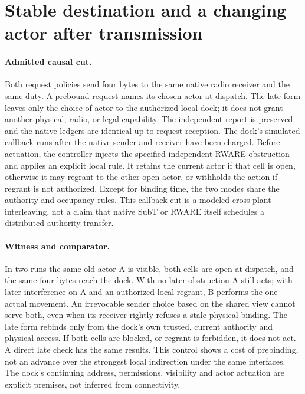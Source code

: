 \documentclass{article}
\begin{document}
\section*{Stable destination and a changing actor after transmission}
\paragraph{Admitted causal cut.}
Both request policies send four bytes to the same native radio
receiver and the same duty. A prebound request names its chosen
actor at dispatch. The late form leaves only the choice of actor
to the authorized local dock; it does not grant another physical,
radio, or legal capability. The independent report is preserved
and the native ledgers are identical up to request reception.
The dock's simulated callback runs after the native sender and
receiver have been charged. Before actuation, the controller
injects the specified independent RWARE obstruction and applies
an explicit local rule. It retains the current actor if that cell
is open, otherwise it may regrant to the other open actor, or
withholds the action if regrant is not authorized. Except for
binding time, the two modes share the authority and occupancy
rules. This callback cut is a modeled cross-plant interleaving,
not a claim that native SubT or RWARE itself schedules a
distributed authority transfer.

\paragraph{Witness and comparator.}
In two runs the same old actor A is visible, both cells are open
at dispatch, and the same four bytes reach the dock. With no later
obstruction A still acts; with later interference on A and an
authorized local regrant, B performs the one actual movement.
An irrevocable sender choice based on the shared view cannot
serve both, even when its receiver rightly refuses a stale
physical binding. The late form rebinds only from the dock's
own trusted, current authority and physical access. If both cells
are blocked, or regrant is forbidden, it does not act.
A direct late check has the same results. This control shows
a cost of prebinding, not an advance over the strongest local
indirection under the same interfaces. The dock's continuing
address, permissions, visibility and actor actuation are explicit
premises, not inferred from connectivity.
\end{document}
